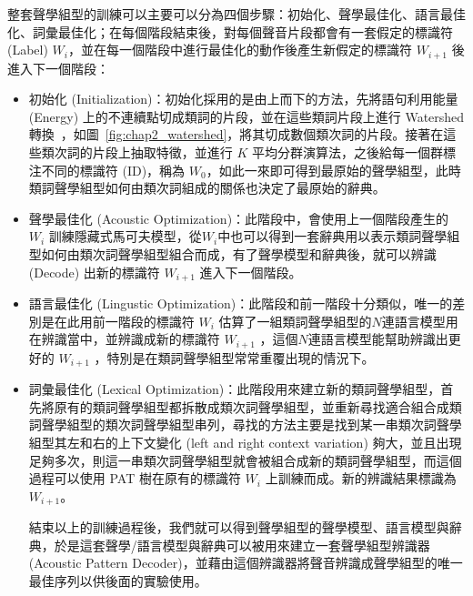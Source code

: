 整套聲學組型的訓練可以主要可以分為四個步驟：初始化、聲學最佳化、語言最佳化、詞彙最佳化；在每個階段結束後，對每個聲音片段都會有一套假定的標識符 (Label) $W_i$，並在每一個階段中進行最佳化的動作後產生新假定的標識符 $W_{i+1}$ 後進入下一個階段：
\begin{itemize}
\itemsep -2pt %
  \item  初始化 (Initialization)：初始化採用的是由上而下的方法，先將語句利用能量 (Energy) 上的不連續點切成類詞的片段，並在這些類詞片段上進行 Watershed 轉換~\cite{DBLP:conf/interspeech/JansenCH10}，如圖~\ref{fig:chap2_watershed}，將其切成數個類次詞的片段。接著在這些類次詞的片段上抽取特徵，並進行 $K$ 平均分群演算法，之後給每一個群標注不同的標識符 (ID)，稱為 $W_0$，如此一來即可得到最原始的聲學組型，此時類詞聲學組型如何由類次詞組成的關係也決定了最原始的辭典。
  \item  聲學最佳化 (Acoustic Optimization)：此階段中，會使用上一個階段產生的 $W_i$ 訓練隱藏式馬可夫模型，從$W_i$中也可以得到一套辭典用以表示類詞聲學組型如何由類次詞聲學組型組合而成，有了聲學模型和辭典後，就可以辨識 (Decode) 出新的標識符 $W_{i+1}$ 進入下一個階段。
  \item  語言最佳化 (Lingustic Optimization)：此階段和前一階段十分類似，唯一的差別是在此用前一階段的標識符 $W_i$ 估算了一組類詞聲學組型的$N$連語言模型用在辨識當中，並辨識成新的標識符 $W_{i+1}$ ，這個$N$連語言模型能幫助辨識出更好的 $W_{i+1}$ ，特別是在類詞聲學組型常常重覆出現的情況下。
  \item  詞彙最佳化 (Lexical Optimization)：此階段用來建立新的類詞聲學組型，首先將原有的類詞聲學組型都拆散成類次詞聲學組型，並重新尋找適合組合成類詞聲學組型的類次詞聲學組型串列，尋找的方法主要是找到某一串類次詞聲學組型其左和右的上下文變化 (left and right context variation) 夠大，並且出現足夠多次，則這一串類次詞聲學組型就會被組合成新的類詞聲學組型，而這個過程可以使用 PAT 樹在原有的標識符 $W_i$ 上訓練而成。新的辨識結果標識為 $W_{i+1}$。

結束以上的訓練過程後，我們就可以得到聲學組型的聲學模型、語言模型與辭典，於是這套聲學/語言模型與辭典可以被用來建立一套聲學組型辨識器 (Acoustic Pattern Decoder)，並藉由這個辨識器將聲音辨識成聲學組型的唯一最佳序列以供後面的實驗使用。

\end{itemize}


